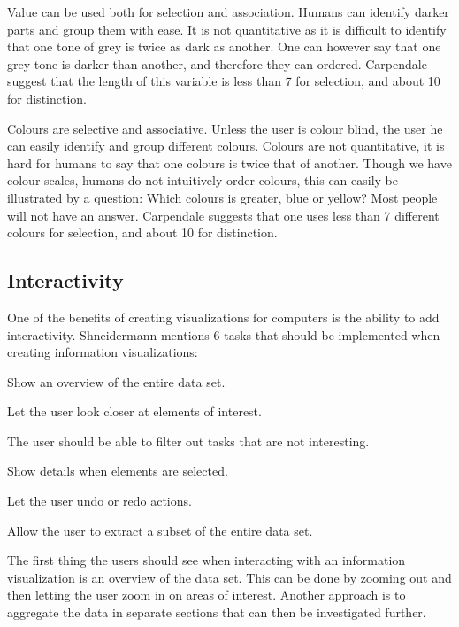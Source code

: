 Value can be used both for selection and association. Humans can identify darker parts and group them with ease. It is not quantitative as it is difficult to identify that one tone of grey is twice as dark as another. One can however say that one grey tone is darker than another, and therefore they can ordered. Carpendale suggest that the length of this variable is less than 7 for selection, and about 10 for distinction.

Colours are selective and associative. Unless the user is colour blind, the user he can easily identify and group different colours. Colours are not quantitative, it is hard for humans to say that one colours is twice that of another. Though we have colour scales, humans do not intuitively order colours, this can easily be illustrated by a question: Which colours is greater, blue or yellow? Most people will not have an answer. Carpendale suggests that one uses less than 7 different colours for selection, and about 10 for distinction.

\subsection{Interactivity}
One of the benefits of creating visualizations for computers is the ability to add interactivity. Shneidermann mentions 6 tasks that should be implemented when creating information visualizations:
\vspace{-3mm}
\begin{description}[itemsep=0cm, parsep=0cm]
  \item[Overview] Show an overview of the entire data set.
  \item[Zoom] Let the user look closer at elements of interest.
  \item[Filter] The user should be able to filter out tasks that are not interesting.
  \item[Details-on-demand] Show details when elements are selected.
  \item[History] Let the user undo or redo actions.
  \item[Extract] Allow the user to extract a subset of the entire data set.
\end{description}

The first thing the users should see when interacting with an information visualization is an overview of the data set. This can be done by zooming out and then letting the user zoom in on areas of interest. Another approach is to aggregate the data in separate sections that can then be investigated further.

